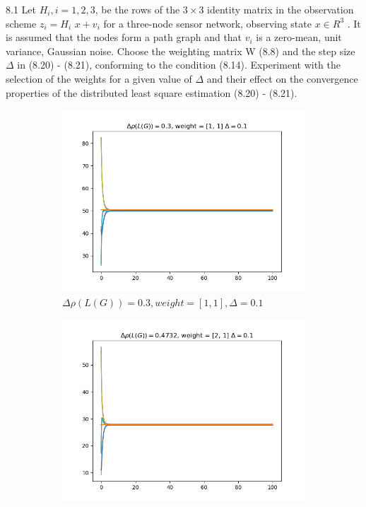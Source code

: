 \documentclass{article}
\begin{document}
\begin{problem} 8.1
    Let $H_i , i = 1, 2, 3$, be the rows of the $3 \times 3$ identity matrix in the observation scheme $z_i = H_i$ $x + v_i$ for a three-node sensor network, observing state $x \in R^3$ . It is assumed that the nodes form a path graph and that $v_i$ is a zero-mean, unit variance, Gaussian noise. Choose the weighting matrix W (8.8) and the step size $\Delta$ in (8.20) - (8.21), conforming to the condition (8.14). Experiment with the selection of the weights for a given value of $\Delta$ and their effect on the convergence properties of the distributed least square estimation (8.20) - (8.21).
    \begin{figure}[!h]
        \centering
        \begin{subfigure}{0.45\textwidth}
            \includegraphics[width=\textwidth]{./img/Figure_0.png}
            \caption{$\Delta \rho (L(G)) = 0.3, weight = [1,1], \Delta = 0.1$}
        \end{subfigure}
        \begin{subfigure}{0.45\textwidth}
            \includegraphics[width=\textwidth]{./img/Figure_1.png}

\end{subfigure}
\end{figure}
\end{problem}
\end{document}
